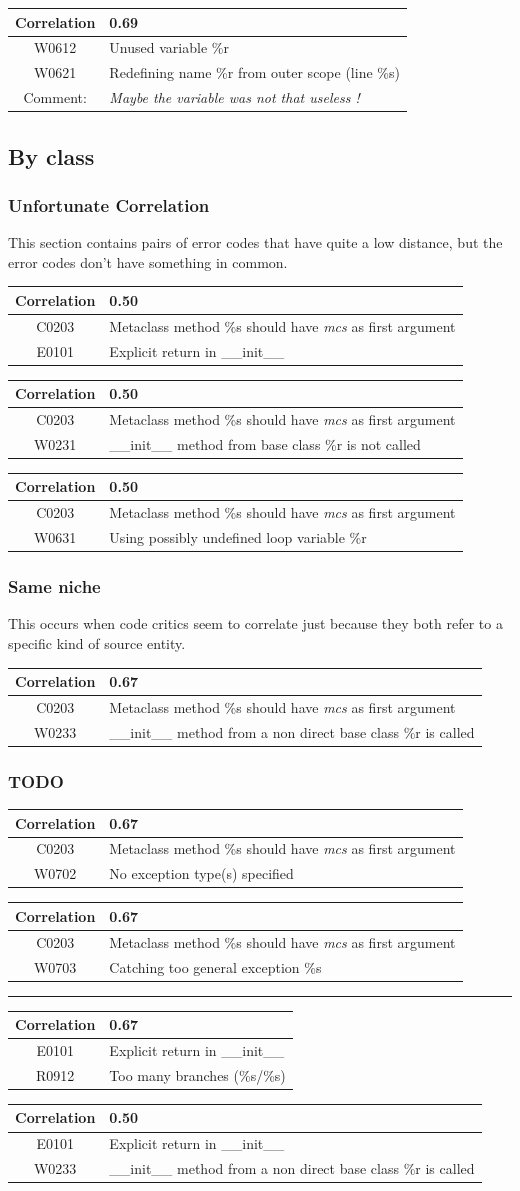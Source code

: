 \documentclass[12pt, a4paper]{article}
\newcommand{\tbf}[1]{\textbf{#1}}
\newcommand{\tit}[1]{\textit{#1}}
\newcommand{\noi}{\noindent}
\newcommand{\Cztwzth}{Metaclass method \%s should have \tit{mcs} as first argument}
\newcommand{\Ezozo}{Explicit return in \_\_init\_\_}
\newcommand{\Rznotw}{Too many branches (\%s/\%s)}
\newcommand{\Wztwtho}{\_\_init\_\_ method from base class \%r is not called}
\newcommand{\Wztwthth}{\_\_init\_\_ method from a non direct base class \%r is called}
\newcommand{\Wzstho}{Using possibly undefined loop variable \%r}
\newcommand{\Wzseztw}{No exception type(s) specified}
\newcommand{\Wzsezth}{Catching too general exception \%s}
\newcommand{\mytab}[5]{
	\begin{tabularx}{\textwidth}{|c|X|}
	\hline
	\tbf{Correlation}		& #1 \\
	\hline
	#2	& #3 \\
	\hline
	#4	& #5 \\
	\hline
	\end{tabularx}
}
\begin{document}
\bigskip \noi
\begin{tabularx}{\textwidth}{|c|X|}
\hline
\tbf{Correlation}   & 0.69 \\
\hline
W0612   & Unused variable \%r \\
\hline
W0621   & Redefining name \%r from outer scope (line \%s) \\
\hline
Comment: & \textit{Maybe the variable was not that useless !}\\
\hline
\end{tabularx}



\bigskip
\subsection{By class}

\subsubsection*{Unfortunate Correlation}
This section contains pairs of error codes that have quite a low distance, but the error codes don't have something in common.

\bigskip \noi
\mytab{0.50}{C0203}{\Cztwzth{}}{E0101}{\Ezozo{}}

\bigskip \noi
\mytab{0.50}{C0203}{\Cztwzth{}}{W0231}{\Wztwtho{}}

\bigskip \noi
\mytab{0.50}{C0203}{\Cztwzth{}}{W0631}{\Wzstho{}}



\subsubsection*{Same niche}
This occurs when code critics seem to correlate just because they both refer to a specific kind of source entity.

\bigskip \noi
\mytab{0.67}{C0203}{\Cztwzth{}}{W0233}{\Wztwthth{}}


\subsubsection*{TODO}

\bigskip \noi
\mytab{0.67}{C0203}{\Cztwzth{}}{W0702}{\Wzseztw{}}

\bigskip \noi
\mytab{0.67}{C0203}{\Cztwzth{}}{W0703}{\Wzsezth{}}

\hrule
\bigskip \noi
\mytab{0.67}{E0101}{\Ezozo{}}{R0912}{\Rznotw{}}

\bigskip \noi
\mytab{0.50}{E0101}{\Ezozo{}}{W0233}{\Wztwthth{}}
\end{document}
